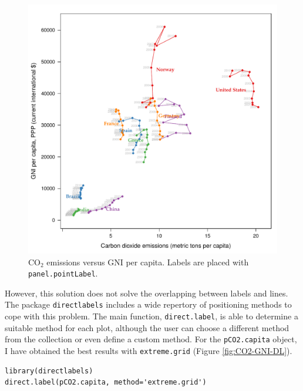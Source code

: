 \begin{figure}[htb]
\centering
\includegraphics[width=.9\linewidth]{figs/CO2_capita.pdf}
\caption{\label{fig:CO2-GNI-glayer}$\mathrm{CO_2}$ emissions versus GNI per capita. Labels are placed with \texttt{panel.pointLabel}.}
\end{figure}


However, this solution does not solve the overlapping between labels
and lines. The package \texttt{directlabels} \cite{Hocking2013} includes a
wide repertory of positioning methods to cope with this problem. The
main function, \texttt{direct.label}, is able to determine a suitable method
for each plot, although the user can choose a different method from
the collection or even define a custom method. For the \texttt{pCO2.capita}
object, I have obtained the best results with \texttt{extreme.grid} (Figure
\ref{fig:CO2-GNI-DL}).


\lstset{language=R,numbers=none}
\begin{lstlisting}
library(directlabels)
direct.label(pCO2.capita, method='extreme.grid')
\end{lstlisting}

